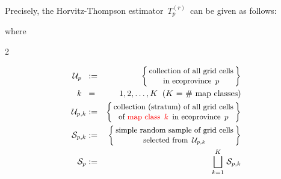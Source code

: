 \vskip 0.5cm
\noindent
Precisely, the Horvitz-Thompson estimator
\,$T^{(r)}_{p}$\,
can be given as follows:

where
\begin{multicols}{2}

    \begin{center}
    \begin{minipage}{3.25in}
    \begin{eqnarray*}
    \mathcal{U}_{p}{\color{white}..}
    & := &
        \left\{\!\!\begin{array}{c}
        \textnormal{\small collection of all grid cells}
        \\
        \textnormal{\small in ecoprovince \,$p$}
        \end{array}\!\!\right\}
    \\
    k{\color{white}..}
    & = &
        1, 2, \ldots, K \;\;\textnormal{($K$ = \# map classes)}
    \\
    \mathcal{U}_{p,k}
    & := &
        \left\{\!\!\begin{array}{c}
        \textnormal{\small collection ({\color{black}stratum}) of all grid cells}
        \\
        \textnormal{\small of {\color{red}map class \,$k$}\, in ecoprovince \,$p$}
        \end{array}\!\!\right\}
    \\
    \mathcal{S}_{p,k}
    & := &
        \left\{\!\!\begin{array}{c}
        \textnormal{\small{\color{black}simple random sample} of grid cells}
        \\
        \textnormal{\small selected from \,$\mathcal{U}_{p,k}$}
        \end{array}\!\!\right\}
    \\
    \mathcal{S}_{p}
    & := &
        \overset{K}{\underset{k=1}{\bigsqcup}}\;\mathcal{S}_{p,k}
    \\
    \end{eqnarray*}
    \end{minipage}
    \end{center}

\columnbreak


\end{multicols}

